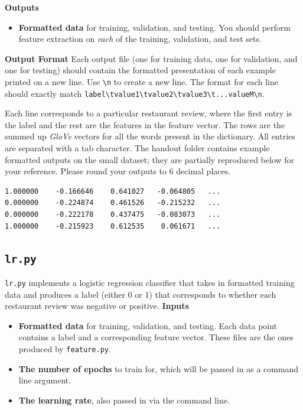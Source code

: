 \documentclass[11pt,addpoints,answers]{exam}
\begin{document}
{\bf Outputs }
\begin{itemize}
    \item \textbf{Formatted data} for training, validation, and testing. You should perform feature extraction on \textit{each} of the training, validation, and test sets.
\end{itemize}

{\bf Output Format }
Each output file (one for training data, one for validation, and one for testing) should contain the formatted presentation of each example printed on a new line. Use \lstinline{\n} to create a new line. The format for each line should exactly match \lstinline{label\tvalue1\tvalue2\tvalue3\t...valueM\n}.

Each line corresponds to a particular restaurant review, where the first entry is the label and the rest are the features in the feature vector. The rows are the summed up \emph{GloVe} vectors for all the words present in the dictionary. All entries are separated with a tab character. The handout folder contains example formatted outputs on the small dataset; they are partially reproduced below for your reference. Please round your outputs to 6 decimal places.


\begin{lstlisting}
1.000000	-0.166646	 0.641027	-0.064805	...
0.000000	-0.224874	 0.461526	-0.215232	...
0.000000	-0.222178	 0.437475	-0.083073	...
1.000000	-0.215923	 0.612535	 0.061671	...
\end{lstlisting}

\subsection{\texttt{lr.py}}\label{lrpy}

\lstinline{lr.py} implements a logistic regression classifier that takes in formatted training data and produces a label (either 0 or 1) that corresponds to whether each restaurant review was negative or positive.
{\bf Inputs }
\begin{itemize}
    \item \textbf{Formatted data} for training, validation, and testing. Each data point contains a label and a corresponding feature vector. These files are the ones produced by \lstinline{feature.py}.
    \item \textbf{The number of epochs} to train for, which will be passed in as a command line argument.
    \item \textbf{The learning rate}, also passed in via the command line.
\end{itemize}
\end{document}

